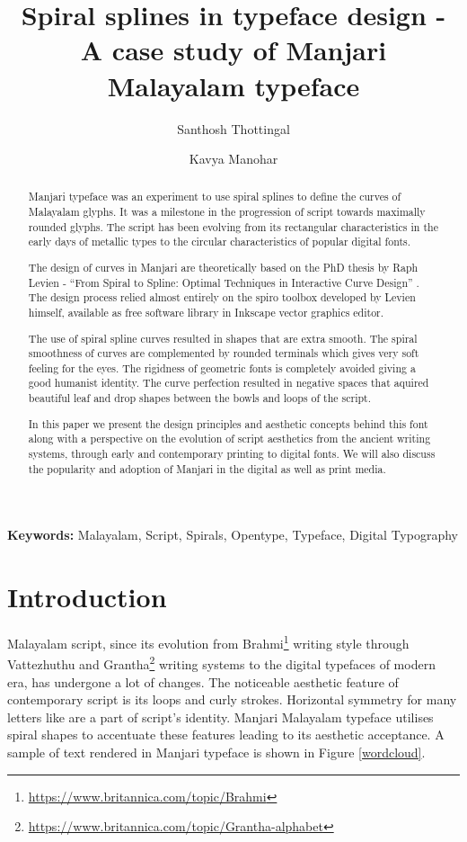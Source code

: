 \documentclass[10pt]{article}
\title{Spiral splines in typeface design - A case study of Manjari Malayalam typeface}
\author{ 
 Santhosh Thottingal
 \and
 Kavya Manohar
}
\begin{document}
\maketitle

\begin{abstract}

Manjari typeface was an experiment to use spiral splines to define the curves of Malayalam glyphs. It was a milestone in the progression of script towards maximally rounded glyphs. The script has been evolving from its rectangular characteristics in the early days of metallic types to the circular characteristics of popular digital fonts. 

The design of curves in Manjari are theoretically based on the PhD thesis by Raph Levien - ``From Spiral to Spline: Optimal Techniques in Interactive Curve Design” \cite{levien}. The design process relied almost entirely on the spiro toolbox developed by Levien himself, available as free software library in Inkscape vector graphics editor.

The use of spiral spline curves resulted in shapes that are extra smooth. The spiral smoothness of curves are complemented by rounded terminals which gives very soft feeling for the eyes. The rigidness of geometric fonts is completely avoided giving a good humanist identity. The curve perfection resulted in negative spaces that aquired beautiful leaf and drop shapes between the bowls and loops of the script. 

In this paper we present the design principles and aesthetic concepts behind this font along with a perspective on the evolution of script aesthetics from the ancient writing systems, through early and contemporary printing to digital fonts. We will also discuss the popularity and adoption of Manjari in the digital as well as print media.
\end{abstract}

\textbf{Keywords:} Malayalam, Script, Spirals, Opentype, Typeface, Digital Typography

\section{Introduction}

Malayalam script, since its evolution from Brahmi\footnote{\url{https://www.britannica.com/topic/Brahmi}} writing style through Vattezhuthu and Grantha\footnote{\url{https://www.britannica.com/topic/Grantha-alphabet}} writing systems to the digital typefaces of modern era, has undergone a lot of changes. The noticeable aesthetic feature of contemporary script is its loops and curly strokes. Horizontal symmetry for many letters like {} are a part of script's identity. Manjari Malayalam typeface utilises spiral shapes to accentuate these features leading to its aesthetic acceptance. A sample of text rendered in Manjari typeface is shown in Figure \ref{wordcloud}.
\end{document}
